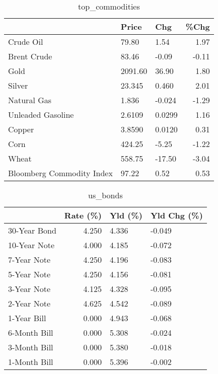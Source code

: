 \documentclass{article}%
\begin{document}
\begin{table}[htbp]%
\caption{top\_commodities}%
\centering%
\begin{adjustbox}{width=1\textwidth}%
\begin{tabular}{lllr}
\toprule
                          &   Price &    Chg &  \%Chg \\
\midrule
               Crude Oil  &   79.80 &   1.54 &  1.97 \\
             Brent Crude  &   83.46 &  -0.09 & -0.11 \\
                    Gold  & 2091.60 &  36.90 &  1.80 \\
                  Silver  &  23.345 &  0.460 &  2.01 \\
             Natural Gas  &   1.836 & -0.024 & -1.29 \\
       Unleaded Gasoline  &  2.6109 & 0.0299 &  1.16 \\
                  Copper  &  3.8590 & 0.0120 &  0.31 \\
                    Corn  &  424.25 &  -5.25 & -1.22 \\
                   Wheat  &  558.75 & -17.50 & -3.04 \\
Bloomberg Commodity Index &   97.22 &   0.52 &  0.53 \\
\bottomrule
\end{tabular}
%
\end{adjustbox}%
\end{table}

%


\begin{table}[htbp]%
\caption{us\_bonds}%
\centering%
\begin{adjustbox}{width=1\textwidth}%
\begin{tabular}{lrll}
\toprule
             &  Rate (\%) & Yld (\%) & Yld Chg (\%) \\
\midrule
30-Year Bond &     4.250 &   4.336 &      -0.049 \\
10-Year Note &     4.000 &   4.185 &      -0.072 \\
 7-Year Note &     4.250 &   4.196 &      -0.083 \\
 5-Year Note &     4.250 &   4.156 &      -0.081 \\
 3-Year Note &     4.125 &   4.328 &      -0.095 \\
 2-Year Note &     4.625 &   4.542 &      -0.089 \\
 1-Year Bill &     0.000 &   4.943 &      -0.068 \\
6-Month Bill &     0.000 &   5.308 &      -0.024 \\
3-Month Bill &     0.000 &   5.380 &      -0.018 \\
1-Month Bill &     0.000 &   5.396 &      -0.002 \\
\bottomrule
\end{tabular}
%
\end{adjustbox}%
\end{table}
\end{document}
